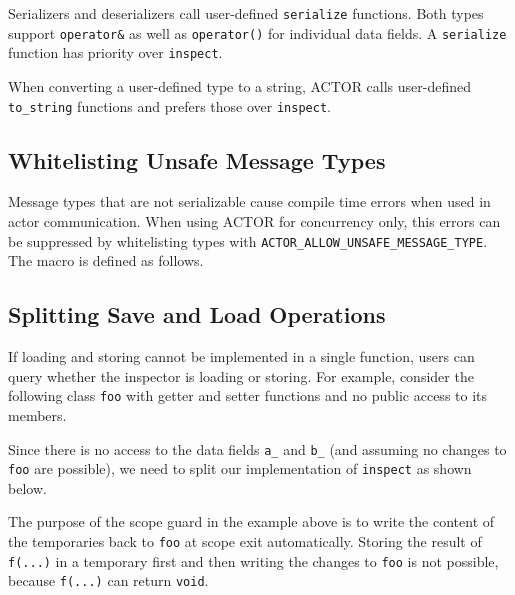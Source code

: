 Serializers and deserializers call user-defined \lstinline^serialize^
functions. Both types support \lstinline^operator&^ as well as
\lstinline^operator()^ for individual data fields. A \lstinline^serialize^
function has priority over \lstinline^inspect^.

When converting a user-defined type to a string, ACTOR calls user-defined
\lstinline^to_string^ functions and prefers those over \lstinline^inspect^.

\subsection{Whitelisting Unsafe Message Types}
\label{unsafe-message-type}

Message types that are not serializable cause compile time errors when used in
actor communication. When using ACTOR for concurrency only, this errors can be
suppressed by whitelisting types with
\lstinline^ACTOR_ALLOW_UNSAFE_MESSAGE_TYPE^. The macro is defined as follows.


\clearpage
\subsection{Splitting Save and Load Operations}

If loading and storing cannot be implemented in a single function, users can
query whether the inspector is loading or storing. For example, consider the
following class \lstinline^foo^ with getter and setter functions and no public
access to its members.


\clearpage
Since there is no access to the data fields \lstinline^a_^ and \lstinline^b_^
(and assuming no changes to \lstinline^foo^ are possible), we need to split our
implementation of \lstinline^inspect^ as shown below.


The purpose of the scope guard in the example above is to write the content of
the temporaries back to \lstinline^foo^ at scope exit automatically. Storing
the result of \lstinline^f(...)^ in a temporary first and then writing the
changes to \lstinline^foo^ is not possible, because \lstinline^f(...)^ can
return \lstinline^void^.
